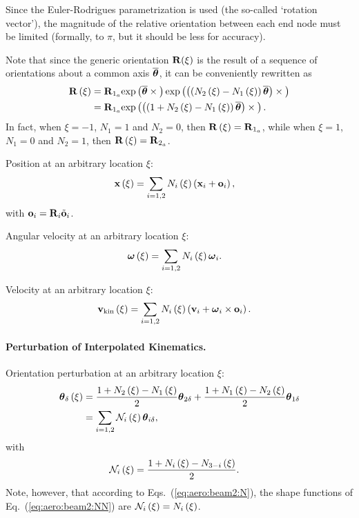 Since the Euler-Rodrigues parametrization is used
(the so-called `rotation vector'),
the magnitude of the relative orientation between each end node
must be limited (formally, to $\pi$, but it should be less for accuracy).

Note that since the generic orientation $\bm{\mathbf{R}}(\xi)$
is the result of a sequence of orientations
about a common axis $\overline{\bm{\mathbf{\theta}}}$,
it can be conveniently rewritten as
\begin{align}
	\bm{\mathbf{R}}\left( \xi \right)
	&= \bm{\mathbf{R}}_{1_a} \text{exp}\left( \overline{\bm{\mathbf{\theta}}}\times{} \right)
		\text{exp}\left( \left( \left( N_2\left( \xi \right) - N_1\left( \xi \right) \right) \overline{\bm{\mathbf{\theta}}} \right)\times{} \right)
	\nonumber \\
	&= \bm{\mathbf{R}}_{1_a} 
		\text{exp}\left( \left( \left( 1 + N_2\left( \xi \right) - N_1\left( \xi \right) \right) \overline{\bm{\mathbf{\theta}}} \right)\times{} \right)
	.
\end{align}
In fact, when $\xi=-1$, $N_1=1$ and $N_2=0$,
then $\bm{\mathbf{R}}\left( \xi \right)=\bm{\mathbf{R}}_{1_a}$,
while when $\xi=1$, $N_1=0$ and $N_2=1$,
then $\bm{\mathbf{R}}\left( \xi \right)=\bm{\mathbf{R}}_{2_a}$.

Position at an arbitrary location $\xi$:
\begin{align}
	\bm{\mathbf{x}}\left( \xi \right)
	&=
	\sum_{i=1,2} N_i\left( \xi \right) \left( 
		\bm{\mathbf{x}}_i + \bm{\mathbf{o}}_i
	 \right)
	,
\end{align}
with $\bm{\mathbf{o}}_i=\bm{\mathbf{R}}_i \tilde{\bm{\mathbf{o}}}_i$.

Angular velocity at an arbitrary location $\xi$:
\begin{align}
	\bm{\mathbf{\omega}}\left( \xi \right)
	&=
	\sum_{i=1,2} N_i\left( \xi \right) \bm{\mathbf{\omega}}_i
	.
\end{align}

Velocity at an arbitrary location $\xi$:
\begin{align}
	\bm{\mathbf{v}}_{\text{kin}}\left( \xi \right)
	&=
	\sum_{i=1,2} N_i\left( \xi \right) \left( 
		\bm{\mathbf{v}}_i
		+ \bm{\mathbf{\omega}}_i \times \bm{\mathbf{o}}_i
	 \right)
	.
\end{align}

\paragraph{Perturbation of Interpolated Kinematics.}
Orientation perturbation at an arbitrary location $\xi$:
\begin{align}
	\bm{\mathbf{\theta}}_{\delta}\left( \xi \right)
	&=
	\frac{1 + N_2\left( \xi \right) - N_1\left( \xi \right)}{2} \bm{\mathbf{\theta}}_{2\delta}
	+ \frac{1 + N_1\left( \xi \right) - N_2\left( \xi \right)}{2} \bm{\mathbf{\theta}}_{1\delta}
	\\
	&=
	\sum_{i=1,2} \mathcal{N}_i\left( \xi \right) \bm{\mathbf{\theta}}_{i\delta}
	,
\end{align}
with
\begin{subequations}
\begin{align}
	\mathcal{N}_i\left( \xi \right)
	&=
	\frac{1 + N_i\left( \xi \right) - N_{3-i}\left( \xi \right)}{2}
	\label{eq:aero:beam2:NN}
	.
\end{align}
\end{subequations}
Note, however, that according to Eqs.~(\ref{eq:aero:beam2:N}),
the shape functions of Eq.~(\ref{eq:aero:beam2:NN})
are $\mathcal{N}_i\left( \xi \right)=N_i\left( \xi \right)$.

